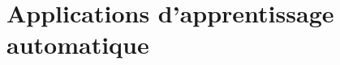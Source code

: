 \documentclass[12pt]{article}
\begin{document}
%

\section*{Applications d'apprentissage automatique}
\end{document}
